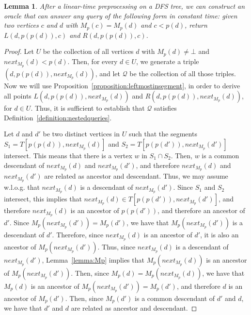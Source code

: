 \documentclass[11pt,a4paper]{article}
\newtheorem{lemma}[theorem]{Lemma}
\begin{document}
\begin{lemma}
\label{lemma:segmentpointsMp}
After a linear-time preprocessing on a DFS tree, we can construct an oracle that can answer any query of the following form in constant time: given two vertices $c$ and $d$ with $M_p(c)=M_p(d)$ and $c<p(d)$, return $L(d,p(p(d)),c)$ and $R(d,p(p(d)),c)$.
\end{lemma}
\begin{proof}
Let $U$ be the collection of all vertices $d$ with $M_p(d)\neq\bot$ and $\mathit{next}_{M_p}(d)<p(d)$. Then, for every $d\in U$, we generate a triple $(d,p(p(d)),\mathit{next}_{M_p}(d))$, and let $\mathcal{Q}$ be the collection of all those triples. Now we will use Proposition~\ref{proposition:leftmostinsegment}, in order to derive all points $L(d,p(p(d)),\mathit{next}_{M_p}(d))$ and $R(d,p(p(d)),\mathit{next}_{M_p}(d))$, for $d\in U$. Thus, it is sufficient to establish that $\mathcal{Q}$ satisfies Definition~\ref{definition:nestedqueries}.

Let $d$ and $d'$ be two distinct vertices in $U$ such that the segments $S_1=T[p(p(d)),\mathit{next}_{M_p}(d)]$ and $S_2=T[p(p(d')),\mathit{next}_{M_p}(d')]$ intersect. This means that there is a vertex $w$ in $S_1\cap S_2$. Then, $w$ is a common descendant of $\mathit{next}_{M_p}(d)$ and $\mathit{next}_{M_p}(d')$, and therefore $\mathit{next}_{M_p}(d)$ and $\mathit{next}_{M_p}(d')$ are related as ancestor and descendant. Thus, we may assume w.l.o.g. that $\mathit{next}_{M_p}(d)$ is a descendant of $\mathit{next}_{M_p}(d')$. Since $S_1$ and $S_2$ intersect, this implies that $\mathit{next}_{M_p}(d)\in T[p(p(d')),\mathit{next}_{M_p}(d')]$, and therefore $\mathit{next}_{M_p}(d)$ is an ancestor of $p(p(d'))$, and therefore an ancestor of $d'$. Since $M_p(\mathit{next}_{M_p}(d'))=M_p(d')$, we have that $M_p(\mathit{next}_{M_p}(d'))$ is a descendant of $d'$. Therefore, since $\mathit{next}_{M_p}(d)$ is an ancestor of $d'$, it is also an ancestor of $M_p(\mathit{next}_{M_p}(d'))$. Thus, since $\mathit{next}_{M_p}(d)$ is a descendant of $\mathit{next}_{M_p}(d')$, Lemma~\ref{lemma:Mp} implies that $M_p(\mathit{next}_{M_p}(d))$ is an ancestor of $M_p(\mathit{next}_{M_p}(d'))$. Then, since $M_p(d)=M_p(\mathit{next}_{M_p}(d))$, we have that $M_p(d)$ is an ancestor of $M_p(\mathit{next}_{M_p}(d'))=M_p(d')$, and therefore $d$ is an ancestor of $M_p(d')$. Then, since $M_p(d')$ is a common descendant of $d'$ and $d$, we have that $d'$ and $d$ are related as ancestor and descendant. 


\end{proof}
\end{document}

